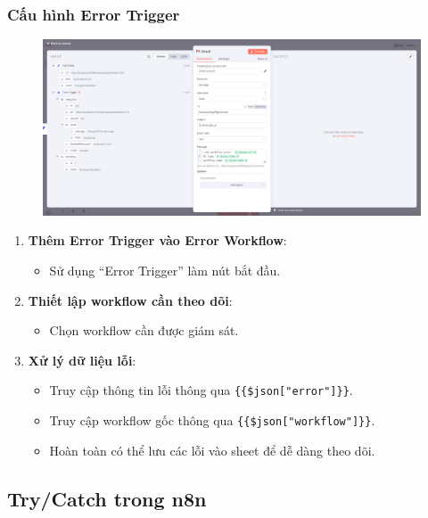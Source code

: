 \subsubsection{Cấu hình Error Trigger}

\begin{figure}[htbp]
    \centering
    \includegraphics[width=1\linewidth]{Chap1-7/mess_error.pdf}
\end{figure}

\begin{enumerate}
  \item \textbf{Thêm Error Trigger vào Error Workflow}:
  \begin{itemize}
    \item Sử dụng ``Error Trigger'' làm nút bắt đầu.
  \end{itemize}

  \item \textbf{Thiết lập workflow cần theo dõi}:
  \begin{itemize}
    \item Chọn workflow cần được giám sát.
  \end{itemize}

  \item \textbf{Xử lý dữ liệu lỗi}:
  \begin{itemize}
    \item Truy cập thông tin lỗi thông qua \texttt{\{\{\$json["error"]\}\}}.
    \item Truy cập workflow gốc thông qua \texttt{\{\{\$json["workflow"]\}\}}.
    \item Hoàn toàn có thể lưu các lỗi vào sheet để dễ dàng theo dõi.
  \end{itemize}
\end{enumerate}


\subsection{Try/Catch trong n8n}

